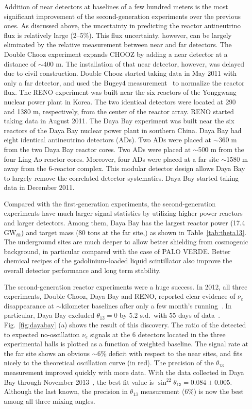 \documentclass[aps,twocolumn,preprintnumbers,amsmath,superscriptaddress,amssymb,floats,nofootinbib]{revtex4-1}
\begin{document}
Addition of near detectors at baselines of a few hundred meters is the most significant improvement of the second-generation experiments over the previous ones.
As discussed above, the uncertainty in predicting the reactor antineutrino flux is relatively large (2--5\%).
This flux uncertainty, however, can be largely eliminated by the relative measurement between near and far detectors.
The Double Chooz experiment expands CHOOZ by adding a near detector at a distance of $\sim$400 m.
The installation of that near detector, however, was delayed due to civil construction.
Double Chooz started taking data in May 2011 with only a far detector, and used the Bugey4 measurement~\cite{Bugey4} to normalize the reactor flux.
The RENO experiment was built near the six reactors of the Yonggwang nuclear power plant in Korea.
The two identical detectors were located at 290 and 1380 m, respectively, from the center of the reactor array.
RENO started taking data in August 2011.
The Daya Bay experiment was built near the six reactors of the Daya Bay nuclear power plant in southern China.
Daya Bay had eight identical antineutrino detectors (ADs).
Two ADs were placed at $\sim$360 m from the two  Daya Bay reactor cores.
Two ADs were placed at $\sim$500 m from the four Ling Ao reactor cores.
Moreover, four ADs were placed at a far site $\sim$1580 m away from the 6-reactor complex.
This modular detector design allows Daya Bay to largely remove the correlated detector systematics.
Daya Bay started taking data in December 2011.

Compared with the first-generation experiments, the second-generation experiments have much larger signal statistics by utilizing higher power reactors and larger detectors. Among them, Daya Bay has the largest reactor power (17.4 GW$_{th}$) and target mass (80 tons at the far site,) as shown in Table~\ref{tab:theta13}.
The underground sites are much deeper to allow better shielding from cosmogenic background, in particular compared with the case of PALO VERDE.
Better chemical recipes of the gadolinium-loaded liquid scintillator also improve the overall detector performance and long term stability.

The second-generation reactor experiments were a huge success.
In 2012, all three experiments, Double Chooz, Daya Bay and RENO, reported
clear evidence of $\bar\nu_{e}$ disappearance at $\sim$kilometer baselines after only a few month's running~\cite{DChooz,Reno,Dayabay}.
In particular, Daya Bay excluded $\theta_{13}=0$ by 5.2 s.d.~with 55 days of data~\cite{Dayabay}. Fig.~\ref{fig:dayabay} (a) shows the result of this discovery. The ratio of the detected to expected no-oscillation $\bar\nu_{e}$ signals at the 6 detectors located in the three experimental halls is plotted as a function of weighted baseline. The signal rate at the far site shows an obvious
$\sim$6\% deficit with respect to the near sites, and fits nicely to the theoretical oscillation curve (in red). The precision of the $\theta_{13}$ measurement improved quickly with more data. With the data collected in Daya Bay through November 2013~\cite{Zhang-Neutrino14}, the best-fit value is $\sin^22\theta_{13} = 0.084 \pm 0.005$.
Although the last known, the precision in $\theta_{13}$ measurement (6\%) is now the best among all three mixing angles.
\end{document}
